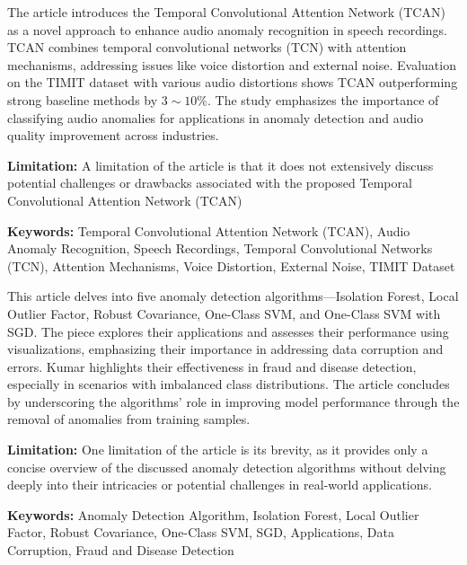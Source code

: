 { 
	The article \cite{Huang:2021} introduces the Temporal Convolutional Attention Network (TCAN) as a novel approach to enhance audio anomaly recognition in speech recordings. TCAN combines temporal convolutional networks (TCN) with attention mechanisms, addressing issues like voice distortion and external noise. Evaluation on the TIMIT dataset with various audio distortions shows TCAN outperforming strong baseline methods by $3\sim10\%$. The study emphasizes the importance of classifying audio anomalies for applications in anomaly detection and audio quality improvement across industries.
	
	
	\bigskip
	
	\textbf{Limitation:} A limitation of the article is that it does not extensively discuss potential challenges or drawbacks associated with the proposed Temporal Convolutional Attention Network (TCAN)
	
	\scriptsize{\textbf{Keywords:} Temporal Convolutional Attention Network (TCAN), Audio Anomaly Recognition, Speech Recordings, Temporal Convolutional Networks (TCN),  Attention Mechanisms, Voice Distortion, External Noise, TIMIT Dataset}
}


{ 
	This article \cite{Kumar:2023} delves into five anomaly detection algorithms—Isolation Forest, Local Outlier Factor, Robust Covariance, One-Class SVM, and One-Class SVM with SGD. The piece explores their applications and assesses their performance using visualizations, emphasizing their importance in addressing data corruption and errors. Kumar highlights their effectiveness in fraud and disease detection, especially in scenarios with imbalanced class distributions. The article concludes by underscoring the algorithms' role in improving model performance through the removal of anomalies from training samples.
	
	\bigskip
	
	\textbf{Limitation:} One limitation of the article is its brevity, as it provides only a concise overview of the discussed anomaly detection algorithms without delving deeply into their intricacies or potential challenges in real-world applications. 
	
	\scriptsize{\textbf{Keywords:} Anomaly Detection Algorithm, Isolation Forest, Local Outlier Factor, Robust Covariance, One-Class SVM, SGD, Applications, Data Corruption, Fraud and Disease Detection}
}


